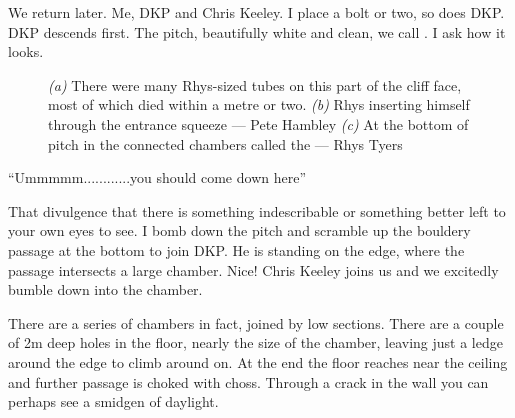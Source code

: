 We return later. Me, DKP and Chris Keeley. I place a bolt or two, so does DKP. DKP descends first. The pitch, beautifully white and clean, we call . I ask how it looks. 

\begin{figure*}[t!]
\checkoddpage \ifoddpage \forcerectofloat \else \forceversofloat \fi
\centering
\begin{subfigure}[t]{0.42\textwidth}
\centering
{}
 \caption{}\label{water chamber below helm's deep}
\end{subfigure}
    \hfill
    \begin{subfigure}[t]{0.56\textwidth}
        \centering
        \caption{} \label{HelmsDeep}
    \end{subfigure}
    
    \vspace{0.3cm}
    \begin{subfigure}[t]{\textwidth}
    \centering
        \caption{} \label{Touching the Void}
    \end{subfigure}
    \caption{
    \emph{(a)} There were many Rhys-sized tubes on this part of the cliff face, most of which died within a metre or two.
    \emph{(b)} Rhys inserting himself through the entrance squeeze --- Pete Hambley
    \emph{(c)} At the bottom of \protect{} pitch in the connected chambers called the \protect{} --- Rhys Tyers}
\end{figure*}

“Ummmmm............you should come down here”
 
 That divulgence that there is something indescribable or something better left to your own eyes to see. I bomb down the pitch and scramble up the bouldery passage at the bottom to join DKP. He is standing on the edge, where the passage intersects  a large chamber. Nice! Chris Keeley joins us and we excitedly bumble down into the chamber.
 
There are a series of chambers in fact, joined by low sections. There are a couple of 2m deep holes in the floor, nearly the size of the chamber, leaving just a ledge around the edge to climb around on. At the end the floor reaches near the ceiling and further passage is choked with choss. Through a crack in the wall you can perhaps see a smidgen of daylight.
 
